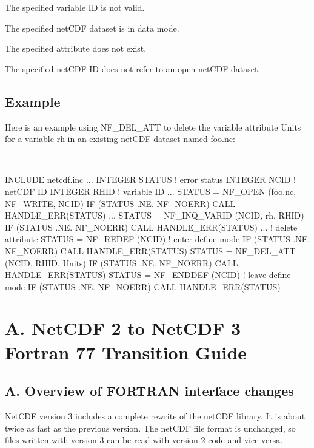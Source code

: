 \begin{DoxyItemize}
\item The specified variable ID is not valid.
\item The specified net\+C\+DF dataset is in data mode.
\item The specified attribute does not exist.
\item The specified net\+C\+DF ID does not refer to an open net\+C\+DF dataset.
\end{DoxyItemize}

\subsection*{Example }

Here is an example using N\+F\+\_\+\+D\+E\+L\+\_\+\+A\+TT to delete the variable attribute Units for a variable rh in an existing net\+C\+DF dataset named foo.\+nc\+:

 

I\+N\+C\+L\+U\+DE \textquotesingle{}netcdf.\+inc\textquotesingle{} ... I\+N\+T\+E\+G\+ER S\+T\+A\+T\+US ! error status I\+N\+T\+E\+G\+ER N\+C\+ID ! net\+C\+DF ID I\+N\+T\+E\+G\+ER R\+H\+ID ! variable ID ... S\+T\+A\+T\+US = N\+F\+\_\+\+O\+P\+EN (\textquotesingle{}foo.\+nc\textquotesingle{}, N\+F\+\_\+\+W\+R\+I\+TE, N\+C\+ID) IF (S\+T\+A\+T\+US .NE. N\+F\+\_\+\+N\+O\+E\+RR) C\+A\+LL H\+A\+N\+D\+L\+E\+\_\+\+E\+R\+R(\+S\+T\+A\+T\+U\+S) ... S\+T\+A\+T\+US = N\+F\+\_\+\+I\+N\+Q\+\_\+\+V\+A\+R\+ID (N\+C\+ID, \textquotesingle{}rh\textquotesingle{}, R\+H\+ID) IF (S\+T\+A\+T\+US .NE. N\+F\+\_\+\+N\+O\+E\+RR) C\+A\+LL H\+A\+N\+D\+L\+E\+\_\+\+E\+R\+R(\+S\+T\+A\+T\+U\+S) ... ! delete attribute S\+T\+A\+T\+US = N\+F\+\_\+\+R\+E\+D\+EF (N\+C\+ID) ! enter define mode IF (S\+T\+A\+T\+US .NE. N\+F\+\_\+\+N\+O\+E\+RR) C\+A\+LL H\+A\+N\+D\+L\+E\+\_\+\+E\+R\+R(\+S\+T\+A\+T\+U\+S) S\+T\+A\+T\+US = N\+F\+\_\+\+D\+E\+L\+\_\+\+A\+TT (N\+C\+ID, R\+H\+ID, \textquotesingle{}Units\textquotesingle{}) IF (S\+T\+A\+T\+US .NE. N\+F\+\_\+\+N\+O\+E\+RR) C\+A\+LL H\+A\+N\+D\+L\+E\+\_\+\+E\+R\+R(\+S\+T\+A\+T\+U\+S) S\+T\+A\+T\+US = N\+F\+\_\+\+E\+N\+D\+D\+EF (N\+C\+ID) ! leave define mode IF (S\+T\+A\+T\+US .NE. N\+F\+\_\+\+N\+O\+E\+RR) C\+A\+LL H\+A\+N\+D\+L\+E\+\_\+\+E\+R\+R(\+S\+T\+A\+T\+U\+S)\hypertarget{nc_f77_interface_guide_f77_nc2_to_nc3_transition_guide}{}\section{A. Net\+C\+D\+F 2 to Net\+C\+D\+F 3 Fortran 77 Transition Guide }\label{nc_f77_interface_guide_f77_nc2_to_nc3_transition_guide}
\hypertarget{nc_f77_interface_guide_f77_overview_of_interface_changes}{}\subsection{A. Overview of F\+O\+R\+T\+R\+A\+N interface changes }\label{nc_f77_interface_guide_f77_overview_of_interface_changes}
Net\+C\+DF version 3 includes a complete rewrite of the net\+C\+DF library. It is about twice as fast as the previous version. The net\+C\+DF file format is unchanged, so files written with version 3 can be read with version 2 code and vice versa.

